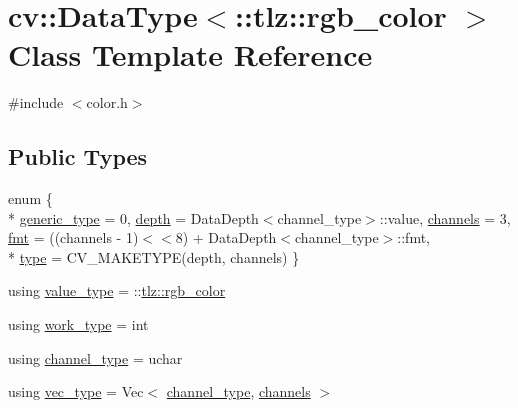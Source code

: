 \hypertarget{classcv_1_1DataType_3_1_1tlz_1_1rgb__color_01_4}{}\section{cv\+:\+:Data\+Type$<$\+:\+:tlz\+:\+:rgb\+\_\+color $>$ Class Template Reference}
\label{classcv_1_1DataType_3_1_1tlz_1_1rgb__color_01_4}


{\ttfamily \#include $<$color.\+h$>$}

\subsection*{Public Types}
\begin{DoxyCompactItemize}
\item 
enum \{ \\*
\hyperlink{classcv_1_1DataType_3_1_1tlz_1_1rgb__color_01_4_ab5eeba9b783966286de7f0dc81e4e692a7378c1e5b7cf8a68352e6f4c664b2d2a}{generic\+\_\+type} = 0, 
\hyperlink{classcv_1_1DataType_3_1_1tlz_1_1rgb__color_01_4_ab5eeba9b783966286de7f0dc81e4e692a8d93e73cdc70922b07ac2e0ca202d789}{depth} = Data\+Depth$<$channel\+\_\+type$>$\+:\+:value, 
\hyperlink{classcv_1_1DataType_3_1_1tlz_1_1rgb__color_01_4_ab5eeba9b783966286de7f0dc81e4e692a251f09d3b31d221e8592a12d91beef38}{channels} = 3, 
\hyperlink{classcv_1_1DataType_3_1_1tlz_1_1rgb__color_01_4_ab5eeba9b783966286de7f0dc81e4e692a5315ec6989ec578226c553ee20335ea6}{fmt} = ((channels -\/ 1)$<$$<$8) + Data\+Depth$<$channel\+\_\+type$>$\+:\+:fmt, 
\\*
\hyperlink{classcv_1_1DataType_3_1_1tlz_1_1rgb__color_01_4_ab5eeba9b783966286de7f0dc81e4e692af82d34097ed7a5f81aaa82e5e2aff035}{type} = C\+V\+\_\+\+M\+A\+K\+E\+T\+Y\+PE(depth, channels)
 \}
\item 
using \hyperlink{classcv_1_1DataType_3_1_1tlz_1_1rgb__color_01_4_a53e9040d6acd2c82bd7b27843033911c}{value\+\_\+type} = \+::\hyperlink{structtlz_1_1rgb__color}{tlz\+::rgb\+\_\+color}
\item 
using \hyperlink{classcv_1_1DataType_3_1_1tlz_1_1rgb__color_01_4_ac3b3faaa700443b53f8527edc1051b0c}{work\+\_\+type} = int
\item 
using \hyperlink{classcv_1_1DataType_3_1_1tlz_1_1rgb__color_01_4_a6aa02cb33c2609e58a8b93ecafb97056}{channel\+\_\+type} = uchar
\item 
using \hyperlink{classcv_1_1DataType_3_1_1tlz_1_1rgb__color_01_4_a51358996d23546beb56e1db3f5ad8e20}{vec\+\_\+type} = Vec$<$ \hyperlink{classcv_1_1DataType_3_1_1tlz_1_1rgb__color_01_4_a6aa02cb33c2609e58a8b93ecafb97056}{channel\+\_\+type}, \hyperlink{classcv_1_1DataType_3_1_1tlz_1_1rgb__color_01_4_ab5eeba9b783966286de7f0dc81e4e692a251f09d3b31d221e8592a12d91beef38}{channels} $>$
\end{DoxyCompactItemize}


